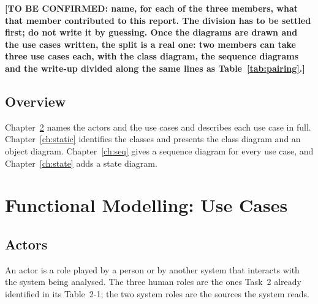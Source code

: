 \documentclass[12pt,a4paper]{report}
\newcommand{\tbd}[1]{{\color{red}\textbf{[TO BE CONFIRMED: #1]}}}
\begin{document}
\tbd{name, for each of the three members, what that member contributed to
this report. The division has to be settled first; do not write it by
guessing. Once the diagrams are drawn and the use cases written, the split
is a real one: two members can take three use cases each, with the class
diagram, the sequence diagrams and the write-up divided along the same
lines as Table~\ref{tab:pairing}.}

\section{Overview}
\label{sec:overview}

Chapter~\ref{ch:use-cases} names the actors and the use cases and describes
each use case in full. Chapter~\ref{ch:static} identifies the classes and
presents the class diagram and an object diagram.
Chapter~\ref{ch:seq} gives a sequence diagram for every use case, and
Chapter~\ref{ch:state} adds a state diagram.

\chapter{Functional Modelling: Use Cases}
\label{ch:use-cases}

\section{Actors}
\label{sec:actors}

An actor is a role played by a person or by another system that interacts
with the system being analysed. The three human roles are the ones Task~2
already identified in its Table~2-1; the two system roles are the sources
the system reads.
\end{document}
